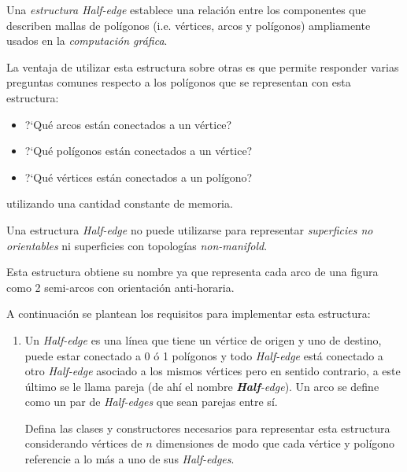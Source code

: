   \begin{Exercise}[title={Estructura \textit{Half-edge}}]
    Una \textit{estructura Half-edge} establece una relación entre los componentes que 
    describen mallas de polígonos (i.e. vértices, arcos y polígonos) 
    ampliamente usados en la \textit{computación gráfica}.

    La ventaja de utilizar esta estructura sobre otras es que permite responder varias 
    preguntas comunes respecto a los polígonos que se representan con esta estructura:

    \begin{itemize}
      
      \item ?`Qué arcos están conectados a un vértice?
      \item ?`Qué polígonos están conectados a un vértice?
      \item ?`Qué vértices están conectados a un polígono? 
    \end{itemize}

    utilizando una cantidad constante de memoria.

    \begin{note}
      Una estructura \textit{Half-edge} no puede utilizarse para representar 
      \textit{superficies no orientables} ni superficies con topologías 
      \textit{non-manifold}.
    \end{note}

    Esta estructura obtiene su nombre ya que representa cada arco de una figura como 2 
    semi-arcos con orientación anti-horaria.

    A continuación se plantean los requisitos para implementar esta estructura:

    \begin{enumerate}
      
      \item Un \textit{Half-edge} es una línea que tiene un vértice de origen y uno de 
        destino, puede estar conectado a 0 ó 1 polígonos y todo \textit{Half-edge} está 
        conectado a otro \textit{Half-edge} asociado a los mismos vértices pero en 
        sentido contrario, a este último se le llama pareja (de ahí el nombre 
        \textit{\textbf{Half}-edge}).
        Un arco se define como un par de \textit{Half-edges} que sean parejas entre sí.

        Defina las clases y constructores necesarios para representar esta estructura 
        considerando vértices de \(n\) dimensiones de modo que cada vértice y polígono 
        referencie a lo más a uno de sus \textit{Half-edges}.


\end{enumerate}
\end{Exercise}
